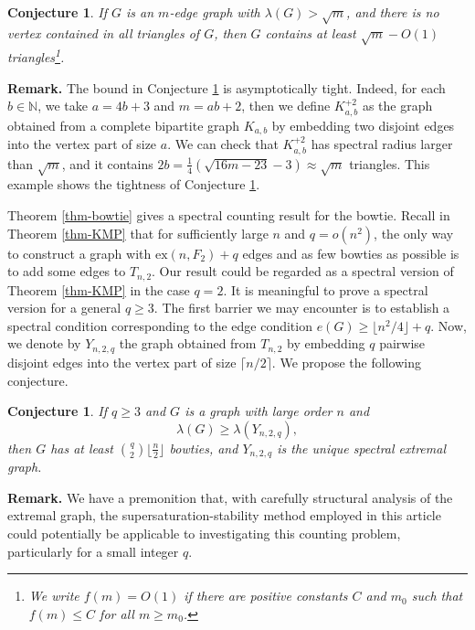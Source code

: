 \documentclass[11pt]{article}
\newtheorem{conjecture}[theorem]{Conjecture}
\begin{document}
\begin{conjecture} \label{conj-71}
If $G$ is an $m$-edge graph with $\lambda (G)> 
 \sqrt{m}$, and there is no vertex contained in all triangles of $G$, 
 then $G$ contains at least $\sqrt{m} - O(1)$ triangles\footnote{We write $f(m)=O(1)$ if there are   positive constants $C$ and $m_0$ such that 
 $f(m)\le C$ for all $m\ge m_0$.}. 
\end{conjecture}


\noindent 
{\bf Remark.} 
The bound in Conjecture \ref{conj-71} 
is asymptotically tight. 
Indeed, for each $b\in \mathbb{N}$, we take 
$a=4b+3$ and $m=ab+2$, then we define $K_{a,b}^{+2}$ as the graph obtained from 
a complete bipartite graph $K_{a,b}$ by embedding  
two disjoint edges into the vertex part of size $a$. 
We can check that $K_{a,b}^{+2}$ has spectral radius 
larger than $\sqrt{m}$, and it contains $2b=\frac{1}{4}
(\sqrt{16m-23} -3) \approx \sqrt{m}$ triangles. 
This example shows the tightness of Conjecture \ref{conj-71}. 



\medskip 
Theorem \ref{thm-bowtie}  gives a spectral counting result for the bowtie.  
Recall in Theorem \ref{thm-KMP} that 
 for sufficiently large $n$ and $q=o(n^2)$,  the only way to construct a graph 
with $\mathrm{ex}(n,F_2) + q$ edges and as few bowties as possible 
is to add some edges to $T_{n,2}$.   
 Our result could be regarded as a spectral version  of Theorem \ref{thm-KMP} in the case $q=2$. 
It is meaningful to prove a spectral version for a general $q\ge 3$. 
The first barrier we may encounter is to establish 
a spectral condition corresponding to the 
edge condition $e(G)\ge \lfloor n^2/4 \rfloor+ q$. 
Now, we denote by $Y_{n,2,q}$ the graph obtained from 
$T_{n,2}$ by embedding $q$ pairwise disjoint edges into the vertex part of size $\lceil n/2\rceil$. 
We propose the following conjecture.  

\begin{conjecture}
If $q\ge 3$ and $G$ is a graph with large order $n$ and  
\[  \lambda (G) \ge \lambda (Y_{n,2,q}), \]
then $G$ has at least ${q\choose 2} \lfloor \frac{n}{2}\rfloor$ 
bowties, and $Y_{n,2,q}$ is the unique spectral extremal graph. 
\end{conjecture} 

\noindent 
{\bf Remark.}  
We have a premonition that,  
with carefully structural analysis of the extremal graph, the supersaturation-stability method employed in this article could potentially be applicable to investigating this counting problem,  
particularly for a small integer $q$.  
\end{document}
